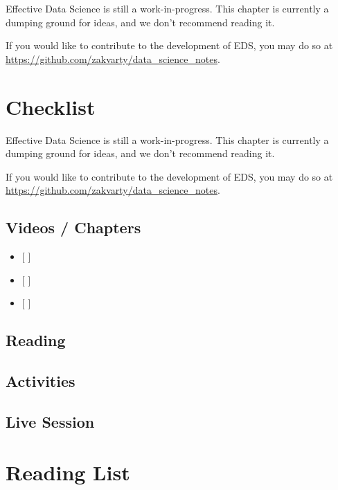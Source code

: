 \documentclass[
  12pt,
]{book}
\begin{document}
Effective Data Science is still a work-in-progress. This chapter is currently a dumping ground for ideas, and we don't recommend reading it.

If you would like to contribute to the development of EDS, you may do so at \url{https://github.com/zakvarty/data_science_notes}.

\hypertarget{ethics-checklist}{%
\chapter*{Checklist}\label{ethics-checklist}}

Effective Data Science is still a work-in-progress. This chapter is currently a dumping ground for ideas, and we don't recommend reading it.

If you would like to contribute to the development of EDS, you may do so at \url{https://github.com/zakvarty/data_science_notes}.

\hypertarget{videos-chapters-4}{%
\section{Videos / Chapters}\label{videos-chapters-4}}

\begin{itemize}
\item
  {[} {]}
\item
  {[} {]}
\item
  {[} {]}
\end{itemize}

\hypertarget{reading-4}{%
\section{Reading}\label{reading-4}}

\hypertarget{activities-2}{%
\section{Activities}\label{activities-2}}

\hypertarget{live-session-4}{%
\section{Live Session}\label{live-session-4}}

\hypertarget{reading-list}{%
\chapter{Reading List}\label{reading-list}}
\end{document}
